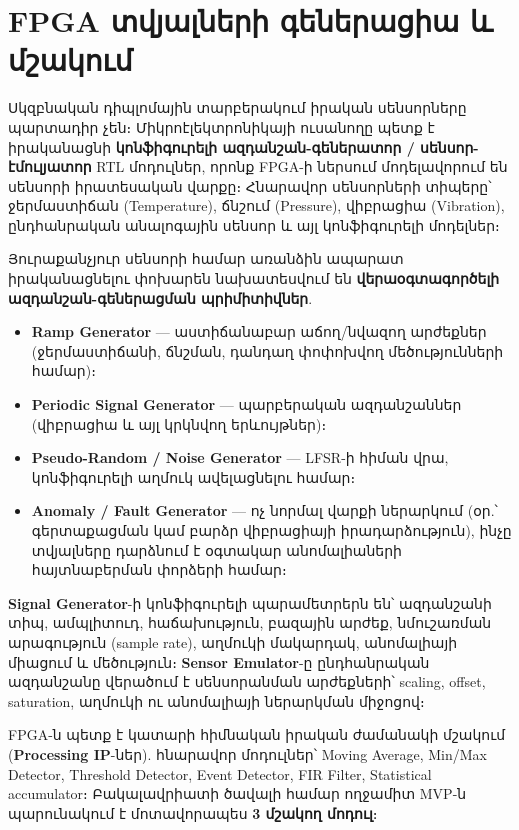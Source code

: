 \chapter{FPGA տվյալների գեներացիա և մշակում}

Սկզբնական դիպլոմային տարբերակում իրական սենսորները պարտադիր չեն։ Միկրոէլեկտրոնիկայի
ուսանողը պետք է իրականացնի \textbf{կոնֆիգուրելի ազդանշան-գեներատոր / սենսոր-էմուլյատոր}
RTL մոդուլներ, որոնք FPGA-ի ներսում մոդելավորում են սենսորի իրատեսական վարքը։
Հնարավոր սենսորների տիպերը՝ ջերմաստիճան (Temperature), ճնշում (Pressure),
վիբրացիա (Vibration), ընդհանրական անալոգային սենսոր և այլ կոնֆիգուրելի մոդելներ։

Յուրաքանչյուր սենսորի համար առանձին ապարատ իրականացնելու փոխարեն նախատեսվում են
\textbf{վերաօգտագործելի ազդանշան-գեներացման պրիմիտիվներ}.

\begin{itemize}[leftmargin=1.4em]
  \item \textbf{Ramp Generator} — աստիճանաբար աճող/նվազող արժեքներ (ջերմաստիճանի,
        ճնշման, դանդաղ փոփոխվող մեծությունների համար)։
  \item \textbf{Periodic Signal Generator} — պարբերական ազդանշաններ (վիբրացիա և
        այլ կրկնվող երևույթներ)։
  \item \textbf{Pseudo-Random / Noise Generator} — LFSR-ի հիման վրա, կոնֆիգուրելի
        աղմուկ ավելացնելու համար։
  \item \textbf{Anomaly / Fault Generator} — ոչ նորմալ վարքի ներարկում (օր.՝
        գերտաքացման կամ բարձր վիբրացիայի իրադարձություն), ինչը տվյալները դարձնում է
        օգտակար անոմալիաների հայտնաբերման փորձերի համար։
\end{itemize}


\textbf{Signal Generator}-ի կոնֆիգուրելի պարամետրերն են՝ ազդանշանի տիպ, ամպլիտուդ,
հաճախություն, բազային արժեք, նմուշառման արագություն (sample rate), աղմուկի մակարդակ,
անոմալիայի միացում և մեծություն։ \textbf{Sensor Emulator}-ը ընդհանրական ազդանշանը
վերածում է սենսորանման արժեքների՝ scaling, offset, saturation, աղմուկի ու անոմալիայի
ներարկման միջոցով։

FPGA-ն պետք է կատարի հիմնական իրական ժամանակի մշակում (\textbf{Processing IP}-ներ).
հնարավոր մոդուլներ՝ Moving Average, Min/Max Detector, Threshold Detector, Event
Detector, FIR Filter, Statistical accumulator։ Բակալավրիատի ծավալի համար ողջամիտ
MVP-ն պարունակում է մոտավորապես \textbf{3 մշակող մոդուլ}։
